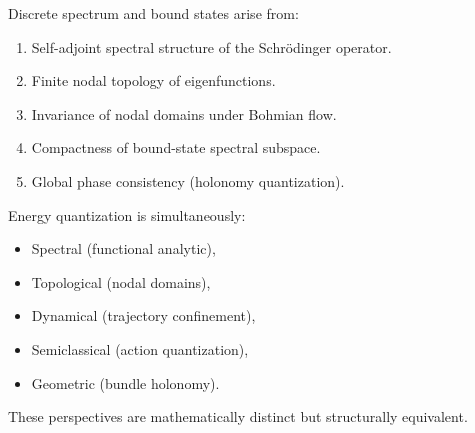 \documentclass[11pt]{article}
\theoremstyle{plain}
\theoremstyle{definition}
\begin{document}
Discrete spectrum and bound states arise from:

\begin{enumerate}
\item Self-adjoint spectral structure of the Schrödinger operator.
\item Finite nodal topology of eigenfunctions.
\item Invariance of nodal domains under Bohmian flow.
\item Compactness of bound-state spectral subspace.
\item Global phase consistency (holonomy quantization).
\end{enumerate}

Energy quantization is simultaneously:

\begin{itemize}
\item Spectral (functional analytic),
\item Topological (nodal domains),
\item Dynamical (trajectory confinement),
\item Semiclassical (action quantization),
\item Geometric (bundle holonomy).
\end{itemize}

These perspectives are mathematically distinct but structurally equivalent.
\end{document}
